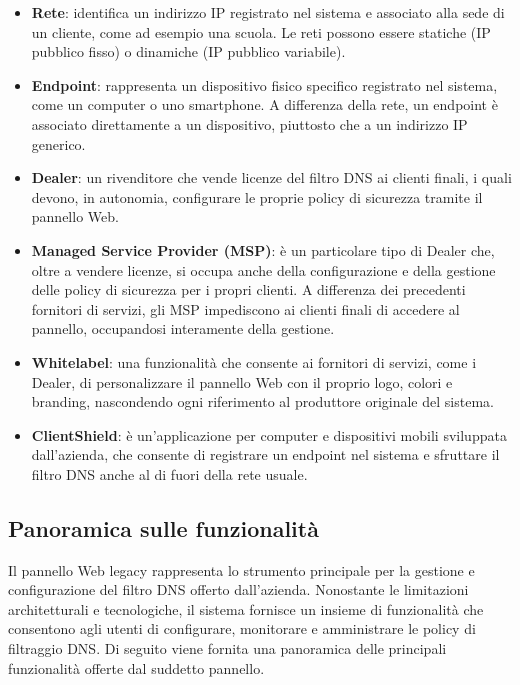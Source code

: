 \begin{itemize}
  \item \textbf{Rete}: identifica un indirizzo IP registrato nel sistema e associato alla sede di un cliente, come ad esempio una scuola. Le reti possono essere statiche (IP pubblico fisso) o dinamiche (IP pubblico variabile).

  \item \textbf{Endpoint}: rappresenta un dispositivo fisico specifico registrato nel sistema, come un computer o uno smartphone. A differenza della rete, un endpoint è associato direttamente a un dispositivo, piuttosto che a un indirizzo IP generico.

  \item \textbf{Dealer}: un rivenditore che vende licenze del filtro DNS ai clienti finali, i quali devono, in autonomia, configurare le proprie policy di sicurezza tramite il pannello Web.

  \item \textbf{Managed Service Provider (MSP)}: è un particolare tipo di Dealer che, oltre a vendere licenze, si occupa anche della configurazione e della gestione delle policy di sicurezza per i propri clienti. A differenza dei precedenti fornitori di servizi, gli MSP impediscono ai clienti finali di accedere al pannello, occupandosi interamente della gestione.

  \item \textbf{Whitelabel}: una funzionalità che consente ai fornitori di servizi, come i Dealer, di personalizzare il pannello Web con il proprio logo, colori e branding, nascondendo ogni riferimento al produttore originale del sistema.

  \item \textbf{ClientShield}: è un'applicazione per computer e dispositivi mobili sviluppata dall'azienda, che consente di registrare un endpoint nel sistema e sfruttare il filtro DNS anche al di fuori della rete usuale.
\end{itemize}

\subsection{Panoramica sulle funzionalità}
Il pannello Web legacy rappresenta lo strumento principale per la gestione e configurazione del filtro DNS offerto dall'azienda. Nonostante le limitazioni architetturali e tecnologiche, il sistema fornisce un insieme di funzionalità che consentono agli utenti di configurare, monitorare e amministrare le policy di filtraggio DNS. Di seguito viene fornita una panoramica delle principali funzionalità offerte dal suddetto pannello.

